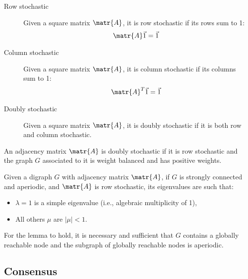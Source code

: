 \begin{description}
    \item[Row stochastic] 
        Given a square matrix $\matr{A}$, it is row stochastic if its rows sum to 1:
        \[ \matr{A}\vec{1} = \vec{1} \]

    \item[Column stochastic] 
        Given a square matrix $\matr{A}$, it is column stochastic if its columns sum to 1:
        \[ \matr{A}^T\vec{1} = \vec{1} \]

    \item[Doubly stochastic] 
        Given a square matrix $\matr{A}$, it is doubly stochastic if it is both row and column stochastic.
\end{description}

\begin{lemma}
    An adjacency matrix $\matr{A}$ is doubly stochastic if it is row stochastic and the graph $G$ associated to it is weight balanced and has positive weights.
\end{lemma}

\begin{lemma} \label{th:strongly_connected_eigenvalues}
    Given a digraph $G$ with adjacency matrix $\matr{A}$, if $G$ is strongly connected and aperiodic, and $\matr{A}$ is row stochastic, its eigenvalues are such that:
    \begin{itemize}
        \item $\lambda = 1$ is a simple eigenvalue (i.e., algebraic multiplicity of 1),
        \item All others $\mu$ are $|\mu| < 1$.
    \end{itemize}

    \indenttbox
    \begin{remark}
        For the lemma to hold, it is necessary and sufficient that $G$ contains a globally reachable node and the subgraph of globally reachable nodes is aperiodic.
    \end{remark}
\end{lemma}


\subsection{Consensus}

